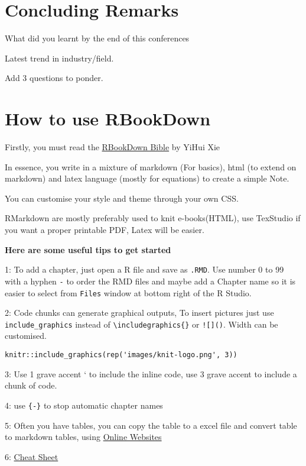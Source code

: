 \documentclass[
]{book}
\begin{document}
\hypertarget{concluding-remarks}{%
\chapter*{Concluding Remarks}\label{concluding-remarks}}

What did you learnt by the end of this conferences

Latest trend in industry/field.

Add 3 questions to ponder.

\hypertarget{how-to-use-rbookdown}{%
\chapter*{How to use RBookDown}\label{how-to-use-rbookdown}}

Firstly, you must read the \href{https://bookdown.org/yihui/bookdown/}{RBookDown Bible} by YiHui Xie

In essence, you write in a mixture of markdown (For basics), html (to extend on markdown) and latex language (mostly for equations) to create a simple Note.

You can customise your style and theme through your own CSS.

RMarkdown are mostly preferably used to knit e-books(HTML), use TexStudio if you want a proper printable PDF, Latex will be easier.

\textbf{Here are some useful tips to get started}

1: To add a chapter, just open a R file and save as \texttt{.RMD}. Use number 0 to 99 with a hyphen \texttt{-} to order the RMD files and maybe add a Chapter name so it is easier to select from \texttt{Files} window at bottom right of the R Studio.

2: Code chunks can generate graphical outputs, To insert pictures just use \texttt{include\_graphics} instead of \texttt{\textbackslash{}includegraphics\{\}} or \texttt{!{[}{]}()}. Width can be customised.

\begin{verbatim}
knitr::include_graphics(rep('images/knit-logo.png', 3))
\end{verbatim}

3: Use 1 grave accent ` to include the inline code, use 3 grave accent to include a chunk of code.

4: use \texttt{\{-\}} to stop automatic chapter names

5: Often you have tables, you can copy the table to a excel file and convert table to markdown tables, using \href{https://www.tablesgenerator.com/markdown_tables}{Online Websites}

6: \href{https://www.rstudio.com/wp-content/uploads/2015/02/rmarkdown-cheatsheet.pdf}{Cheat Sheet}

  
\end{document}
